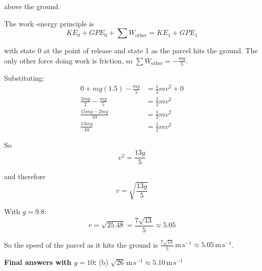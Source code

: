 \documentclass[leqno]{article}
\begin{document}
\begin{enumerate}[
  label=\textbf{\arabic*.},
  leftmargin=*,
  topsep=0pt,
  partopsep=0pt,
  parsep=0pt
]
\begin{djsSolution}
\begin{enumerate}[label=\textbf{(\alph*)}]
  above the ground.

  The work--energy principle is
  \[
  KE_0+GPE_0+\sum W_{\text{other}}=KE_1+GPE_1
  \]

  with state 0 at the point of release and state 1 as the parcel hits the ground. The only other force doing work is friction, so \(\sum W_{\text{other}}=-\frac{mg}{5}\).

  Substituting:
  \begin{align*}
  0 + mg(1.5) - \frac{mg}{5} &= \frac12 mv^2 + 0 \\
  \frac{3mg}{2}-\frac{mg}{5} &= \frac12 mv^2 \\
  \frac{15mg-2mg}{10} &= \frac12 mv^2 \\
  \frac{13mg}{10} &= \frac12 mv^2
  \end{align*}
  
  So
  \[
  v^2=\frac{13g}{5}
  \]

  and therefore
  \[
  v=\sqrt{\frac{13g}{5}}
  \]
  
  With \(g=9.8\):
  \[
  v=\sqrt{25.48}=\frac{7\sqrt{13}}{5}\approx 5.05
  \]

  So the speed of the parcel as it hits the ground is \(\frac{7\sqrt{13}}{5}\,\mathrm{m\,s^{-1}}\approx 5.05\,\mathrm{m\,s^{-1}}\).
\end{enumerate}
\par\medskip\noindent\textbf{Final answers with \(g = 10\):} (b) \(\sqrt{26}\,\mathrm{m\,s^{-1}}\approx 5.10\,\mathrm{m\,s^{-1}}\)
\end{djsSolution}


\newpage

\questionitem

\begin{figure}[H]
    \centering
{}
\end{figure}
\end{enumerate}
\end{document}
